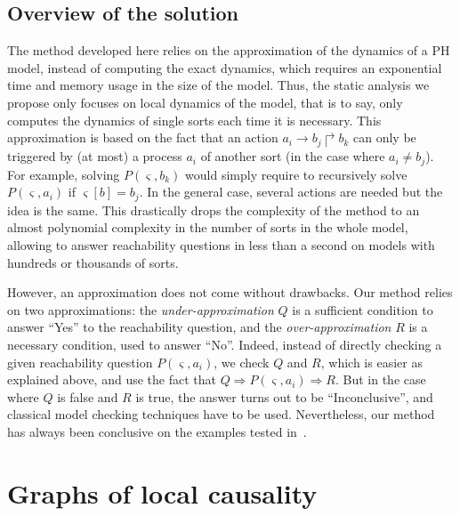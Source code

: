 \documentclass{movep}
\newcommand{\PHfrappeA}{\rightarrow}
\newcommand{\PHfrappeB}{\Rsh}
\newcommand{\PHfrappe}[3]{#1\PHfrappeA#2\PHfrappeB#3}
\def\ctx{\varsigma}
\newcommand{\Pcai}{P(\ctx, a_i)}
\def\PHget#1#2{{#1[#2]}}
\def\ctx{\varsigma}
\newcounter{la}
\begin{document}
\subsection{Overview of the solution}

The method developed here relies on the approximation of the dynamics of a PH model,
instead of computing the exact dynamics, which requires an exponential time and memory usage
in the size of the model.
Thus, the static analysis we propose
only focuses on local dynamics of the model, that is to say, only computes the dynamics of
single sorts each time it is necessary.
This approximation is based on the fact that an action $\PHfrappe{a_i}{b_j}{b_k}$
can only be triggered by (at most) a process $a_i$ of another sort (in the case where $a_i \neq b_j$).
For example, solving $P(\ctx, b_k)$ would simply require to recursively solve $P(\ctx, a_i)$
if $\PHget{\ctx}{b} = {b_j}$.
In the general case, several actions are needed but the idea is the same.
This drastically drops the complexity of the method %
to an almost polynomial complexity in the number of sorts in the whole model,
allowing to answer reachability questions in less than a second
on models with hundreds or thousands of sorts.

However, an approximation does not come without drawbacks.
Our method relies on two approximations:
the \emph{under-approximation} $Q$ is a sufficient condition
to answer “Yes” to the reachability question,
and the \emph{over-approximation} $R$ is a necessary condition, used to answer “No”.
Indeed, instead of directly checking a given reachability question $\Pcai$,
we check $Q$ and $R$, which is easier as explained above,
and use the fact that $Q \Rightarrow \Pcai \Rightarrow R$.
But in the case where $Q$ is false and $R$ is true,
the answer turns out to be “Inconclusive”,
and classical model checking techniques have to be used.
Nevertheless, our method has always been conclusive on the examples tested in~\cite{PMR12-MSCS}.



\section{Graphs of local causality}
\label{sec:glc}
\end{document}
